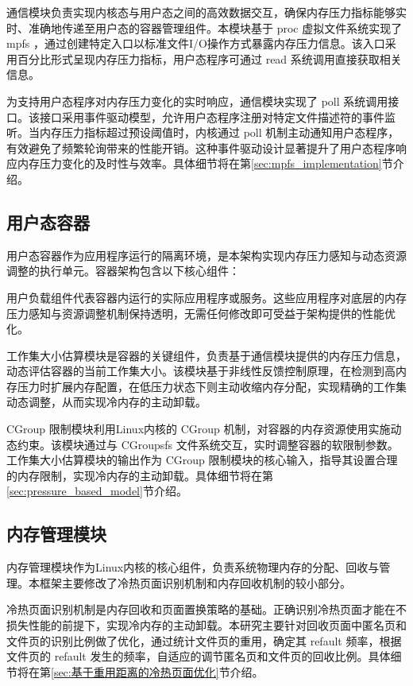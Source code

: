 通信模块负责实现内核态与用户态之间的高效数据交互，确保内存压力指标能够实时、准确地传递至用户态的容器管理组件。本模块基于 proc 虚拟文件系统实现了 mpfs ，通过创建特定入口以标准文件I/O操作方式暴露内存压力信息。该入口采用百分比形式呈现内存压力指标，用户态程序可通过 read 系统调用直接获取相关信息。

为支持用户态程序对内存压力变化的实时响应，通信模块实现了 poll 系统调用接口。该接口采用事件驱动模型，允许用户态程序注册对特定文件描述符的事件监听。当内存压力指标超过预设阈值时，内核通过 poll 机制主动通知用户态程序，有效避免了频繁轮询带来的性能开销。这种事件驱动设计显著提升了用户态程序响应内存压力变化的及时性与效率。具体细节将在第\ref{sec:mpfs_implementation}节介绍。

\subsection{用户态容器}

用户态容器作为应用程序运行的隔离环境，是本架构实现内存压力感知与动态资源调整的执行单元。容器架构包含以下核心组件：

用户负载组件代表容器内运行的实际应用程序或服务。这些应用程序对底层的内存压力感知与资源调整机制保持透明，无需任何修改即可受益于架构提供的性能优化。

工作集大小估算模块是容器的关键组件，负责基于通信模块提供的内存压力信息，动态评估容器的当前工作集大小。该模块基于非线性反馈控制原理，在检测到高内存压力时扩展内存配置，在低压力状态下则主动收缩内存分配，实现精确的工作集动态调整，从而实现冷内存的主动卸载。

 CGroup 限制模块利用Linux内核的 CGroup 机制，对容器的内存资源使用实施动态约束。该模块通过与 CGroupsfs 文件系统交互，实时调整容器的软限制参数。工作集大小估算模块的输出作为 CGroup 限制模块的核心输入，指导其设置合理的内存限制，实现冷内存的主动卸载。具体细节将在第\ref{sec:pressure_based_model}节介绍。

\subsection{内存管理模块}

内存管理模块作为Linux内核的核心组件，负责系统物理内存的分配、回收与管理。本框架主要修改了冷热页面识别机制和内存回收机制的较小部分。

冷热页面识别机制是内存回收和页面置换策略的基础。正确识别冷热页面才能在不损失性能的前提下，实现冷内存的主动卸载。本研究主要针对回收页面中匿名页和文件页的识别比例做了优化，通过统计文件页的重用，确定其 refault 频率，根据文件页的 refault 发生的频率，自适应的调节匿名页和文件页的回收比例。具体细节将在第\ref{sec:基于重用距离的冷热页面优化}节介绍。

